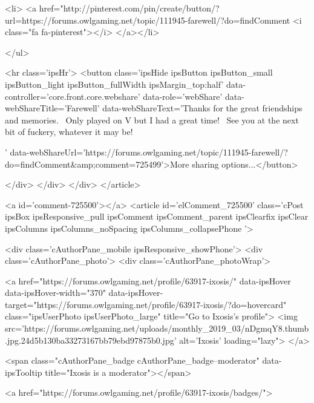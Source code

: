 			<li>
<a href="http://pinterest.com/pin/create/button/?url=https://forums.owlgaming.net/topic/111945-farewell/?do=findComment%
	<i class="fa fa-pinterest"></i>
</a></li>
		
	</ul>


	<hr class='ipsHr'>
	<button class='ipsHide ipsButton ipsButton_small ipsButton_light ipsButton_fullWidth ipsMargin_top:half' data-controller='core.front.core.webshare' data-role='webShare' data-webShareTitle='Farewell' data-webShareText='Thanks for the great friendships and memories.  Only played on V but I had a great time!  See you at the next bit of fuckery, whatever it may be!
 
' data-webShareUrl='https://forums.owlgaming.net/topic/111945-farewell/?do=findComment&amp;comment=725499'>More sharing options...</button>

	
</div>
</div>
	</div>
</article>
					
				
					
					
					



<a id='comment-725500'></a>
<article  id='elComment_725500' class='cPost ipsBox ipsResponsive_pull  ipsComment  ipsComment_parent ipsClearfix ipsClear ipsColumns ipsColumns_noSpacing ipsColumns_collapsePhone    '>
	

	

	<div class='cAuthorPane_mobile ipsResponsive_showPhone'>
		<div class='cAuthorPane_photo'>
			<div class='cAuthorPane_photoWrap'>
				


	<a href="https://forums.owlgaming.net/profile/63917-ixosis/" data-ipsHover data-ipsHover-width="370" data-ipsHover-target="https://forums.owlgaming.net/profile/63917-ixosis/?do=hovercard" class="ipsUserPhoto ipsUserPhoto_large" title="Go to Ixosis's profile">
		<img src='https://forums.owlgaming.net/uploads/monthly_2019_03/nDgmqY8.thumb.jpg.24d5b130ba33273167bb79ebd97875b0.jpg' alt='Ixosis' loading="lazy">
	</a>

				
				<span class="cAuthorPane_badge cAuthorPane_badge--moderator" data-ipsTooltip title="Ixosis is a moderator"></span>
				
				
					<a href="https://forums.owlgaming.net/profile/63917-ixosis/badges/">
						
